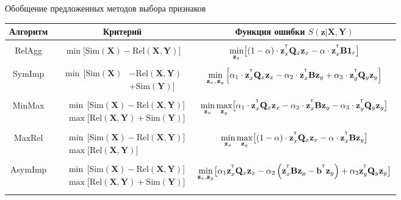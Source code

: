 \documentclass[9pt]{beamer}
\newcommand{\bb}{\mathbf{b}}
\newcommand{\bz}{\mathbf{z}}
\newcommand{\bB}{\mathbf{B}}
\newcommand{\bQ}{\mathbf{Q}}
\newcommand{\bX}{\mathbf{X}}
\newcommand{\bY}{\mathbf{Y}}
\newcommand{\T}{^{\text{\tiny\sffamily\upshape\mdseries T}}}
\newcommand{\bOne}{\boldsymbol{1}}
\begin{document}
\begin{frame}{Обобщение предложенных методов выбора признаков}
\begin{table}
	\centering
	\footnotesize{
		\begin{tabular}{c|c|c}
			\hline
			Алгоритм & Критерий & Функция ошибки $S(\bz | \bX, \bY)$ \\
			\hline && \\ 
			RelAgg & $\min \bigl[ \text{Sim}(\bX) - \text{Rel}(\bX, \bY) \bigr] $ & $\min\limits_{\bz_x} \bigl[ (1 - \alpha) \cdot \bz_x^{\T} \bQ_x \bz_x - \alpha \cdot \bz_x^{\T} \bB \bOne_r \bigr] $ \\ &&\\
			SymImp & $\begin{aligned} \min \, \bigl[ \text{Sim}(\bX) & - \text{Rel}(\bX, \bY) \\ & + \text{Sim}(\bY) \bigr] \end{aligned}$ & $ \min\limits_{\bz_x, \, \bz_y} \left[ \alpha_1 \cdot \bz_x^{\T} \bQ_x \bz_x - \alpha_2 \cdot \bz_x^{\T} \bB \bz_y + \alpha_3 \cdot \bz_y^{\T} \bQ_y \bz_y \right] $\\ &&\\ 
			MinMax & $\begin{aligned} &\min \, \bigl[ \text{Sim}(\bX) - \text{Rel}(\bX, \bY) \bigr]  \\ & \max \bigl[\text{Rel}(\bX, \bY) + \text{Sim}(\bY) \bigr] \end{aligned}$ & $	\min\limits_{\bz_x} 	\max\limits_{\bz_y} \bigl[\alpha_1 \cdot \bz_x^{\T} \bQ_x \bz_x - \alpha_2 \cdot \bz_x^{\T} \bB \bz_y - \alpha_3 \cdot \bz_y^{\T} \bQ_y \bz_y \bigr]$ \\ &&\\ 
			MaxRel & $\begin{aligned} &\min \, \bigl[ \text{Sim}(\bX) - \text{Rel}(\bX, \bY) \bigr]  \\ & \max \bigl[\text{Rel}(\bX, \bY) \bigr] \end{aligned}$& $\min\limits_{\bz_x} 	\max\limits_{\bz_y} \bigl[ (1 - \alpha) \cdot \bz_x^{\T} \bQ_x \bz_x - \alpha \cdot \bz_x^{\T} \bB \bz_y \bigr]$ \\ 		&&\\
			AsymImp & $\begin{aligned} & \min \, \bigl[ \text{Sim}(\bX) - \text{Rel}(\bX, \bY) \bigr]\\ &  \max \bigl[\text{Rel}(\bX, \bY) + \text{Sim}(\bY) \bigr] \end{aligned}$ & $\min\limits_{\bz_x, \bz_y} \bigl[ \alpha_1 \bz_x^{\T} \bQ_x \bz_x - \alpha_2 \left(\bz_x^{\T} \bB \bz_y - \bb^{\T} \bz_y \right) + \alpha_3  \bz_y^{\T} \bQ_y \bz_y \bigr]$\\  && \\
			\hline
	\end{tabular}}
\end{table}
\end{frame}
\end{document}
